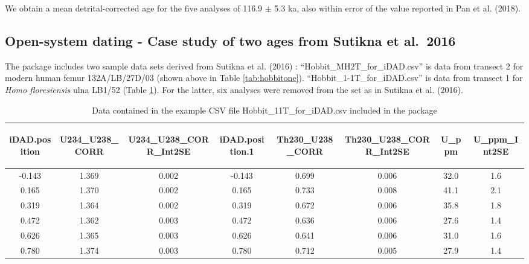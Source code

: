 \documentclass[]{elsarticle} %
\begin{document}
We obtain a mean detrital-corrected age for the five analyses of 116.9 \(\pm\) 5.3 ka, also within error of the value reported in Pan et al. (2018).

\hypertarget{open-system-dating---case-study-of-two-ages-from-sutikna-et-al.-2016}{%
\subsection{Open-system dating - Case study of two ages from Sutikna et al.~2016}\label{open-system-dating---case-study-of-two-ages-from-sutikna-et-al.-2016}}

The package includes two sample data sets derived from Sutikna et al. (2016) : ``Hobbit\_MH2T\_for\_iDAD.csv'' is data from transect 2 for modern human femur 132A/LB/27D/03 (shown above in Table \ref{tab:hobbitone}). ``Hobbit\_1-1T\_for\_iDAD.csv'' is data from transect 1 for \emph{Homo floresiensis} ulna LB1/52 (Table \ref{tab:table-human}). For the latter, six analyses were removed from the set as in Sutikna et al. (2016).

\begin{table}[ht]
\centering
\begin{tabular}{cccccccc}
  \hline
\begin{sideways} iDAD.position \end{sideways} & \begin{sideways} U234\_U238\_CORR \end{sideways} & \begin{sideways} U234\_U238\_CORR\_Int2SE \end{sideways} & \begin{sideways} iDAD.position.1 \end{sideways} & \begin{sideways} Th230\_U238\_CORR \end{sideways} & \begin{sideways} Th230\_U238\_CORR\_Int2SE \end{sideways} & \begin{sideways} U\_ppm \end{sideways} & \begin{sideways} U\_ppm\_Int2SE \end{sideways} \\ 
  \hline
-0.143 & 1.369 & 0.002 & -0.143 & 0.699 & 0.006 & 32.0 & 1.6 \\ 
  0.165 & 1.370 & 0.002 & 0.165 & 0.733 & 0.008 & 41.1 & 2.1 \\ 
  0.319 & 1.364 & 0.002 & 0.319 & 0.672 & 0.006 & 35.8 & 1.8 \\ 
  0.472 & 1.362 & 0.003 & 0.472 & 0.636 & 0.006 & 27.6 & 1.4 \\ 
  0.626 & 1.365 & 0.003 & 0.626 & 0.641 & 0.006 & 31.0 & 1.6 \\ 
  0.780 & 1.374 & 0.003 & 0.780 & 0.712 & 0.005 & 27.9 & 1.4 \\ 
   \hline
\end{tabular}
\caption{\label{tab:table-human}Data contained in the example CSV file Hobbit\_1\-1T\_for\_iDAD.csv included in the package} 
\end{table}
\end{document}
